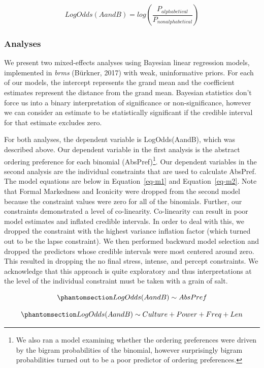 \documentclass[
  10pt,
  nohyperref]{acl}
\begin{document}
\[
LogOdds(AandB) = log(\frac{P_{alphabetical}}{P_{nonalphabetical}})
\]

\subsubsection{Analyses}\label{analyses}

We present two mixed-effects analyses using Bayesian linear regression
models, implemented in \emph{brms} (Bürkner, 2017) with weak,
uninformative priors. For each of our models, the intercept represents
the grand mean and the coefficient estimates represent the distance from
the grand mean. Bayesian statistics don't force us into a binary
interpretation of significance or non-significance, however we can
consider an estimate to be statistically significant if the credible
interval for that estimate excludes zero.

For both analyses, the dependent variable is LogOdds(AandB), which was
described above. Our dependent variable in the first analysis is the
abstract ordering preference for each binomial (AbsPref)\footnote{We
  also ran a model examining whether the ordering preferences were
  driven by the bigram probabilities of the binomial, however
  surprisingly bigram probabilities turned out to be a poor predictor of
  ordering preferences.}. Our dependent variables in the second analysis
are the individual constraints that are used to calculate AbsPref. The
model equations are below in Equation~\ref{eq-m1} and
Equation~\ref{eq-m2}. Note that Formal Markedness and Iconicity were
dropped from the second model because the constraint values were zero
for all of the binomials. Further, our constraints demonstrated a level
of co-linearity. Co-linearity can result in poor model estimates and
inflated credible intervals. In order to deal with this, we dropped the
constraint with the highest variance inflation factor (which turned out
to be the lapse constraint). We then performed backward model selection
and dropped the predictors whose credible intervals were most centered
around zero. This resulted in dropping the no final stress, intense, and
percept constraints. We acknowledge that this approach is quite
exploratory and thus interpretations at the level of the individual
constraint must be taken with a grain of salt.

\begin{equation}\phantomsection\label{eq-m1}{
LogOdds(AandB) \sim AbsPref
}\end{equation}

\begin{equation}\phantomsection\label{eq-m2}{
LogOdds(AandB) \sim Culture + Power + Freq + Len
}\end{equation}
\end{document}
